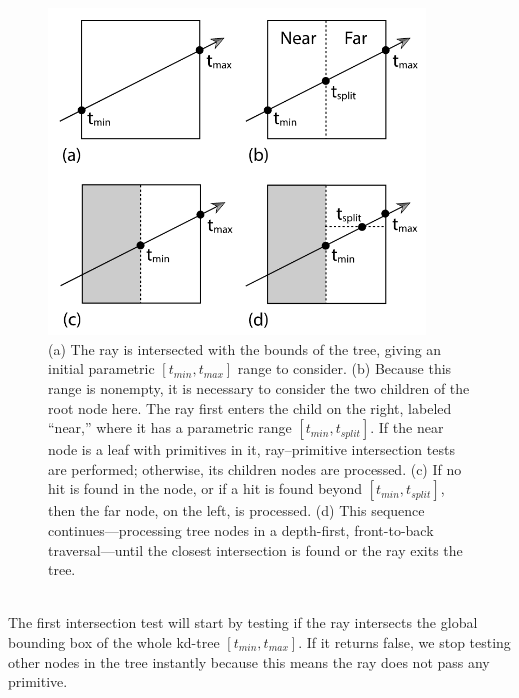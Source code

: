 \documentclass[11pt,a4paper]{article}
\begin{document}
\begin{figure}[H]	
     \centering
     \captionsetup{justification=centering,margin=2cm}
     \includegraphics[width=10cm]{images/kdtree/traversal.png}
     \caption{(a) The ray is intersected with the bounds of the tree, giving an initial parametric $[t_{min}, t_{max}]$ range to consider. (b) Because this range is nonempty, it is necessary to consider the two children of the root node here. The ray first enters the child on the right, labeled “near,” where it has a parametric range $[t_{min}, t_{split}]$. If the near node is a leaf with primitives in it, ray–primitive intersection tests are performed; otherwise, its children nodes are processed. (c) If no hit is found in the node, or if a hit is found beyond $[t_{min}, t_{split}]$, then the far node, on the left, is processed. (d) This sequence continues—processing tree nodes in a depth-first, front-to-back traversal—until the closest intersection is found or the ray exits the tree. \protect\cite{Pharr2016}}
        \label{fig:dice}
\end{figure}

\noindent
\\
The first intersection test will start by testing if the ray intersects the global bounding box of the whole kd-tree $[t_{min}, t_{max}]$. If it returns false, we stop testing other nodes in the tree instantly because this means the ray does not pass any primitive.
\end{document}
